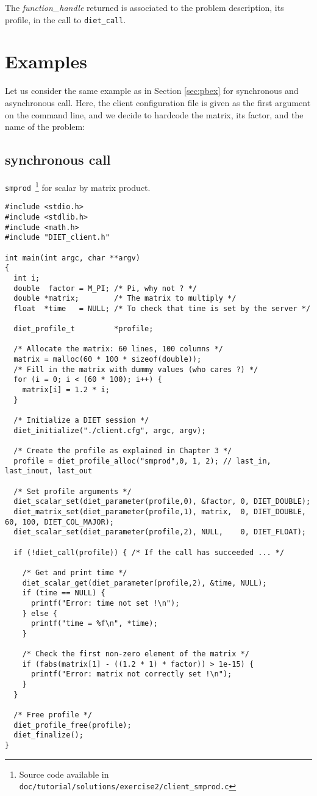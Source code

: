 The \emph{function\_handle} returned is associated to the problem description,
its profile, in the call to \texttt{diet\_call}.

\section{Examples}
\label{sec:cl_ex}

Let us consider the same example as in Section \ref{sec:pbex} for synchronous 
and asynchronous call.  Here, the client configuration file is given as the 
first argument on the command line, and we decide to hardcode the matrix,
its factor, and the name of the problem:

\subsection{synchronous call}
\texttt{smprod}~\footnote{Source code available in \texttt{doc/tutorial/solutions/exercise2/client\_smprod.c}} for scalar by matrix product.

{\footnotesize
\begin{verbatim}
#include <stdio.h>
#include <stdlib.h>
#include <math.h>
#include "DIET_client.h"

int main(int argc, char **argv)
{
  int i;
  double  factor = M_PI; /* Pi, why not ? */
  double *matrix;        /* The matrix to multiply */
  float  *time   = NULL; /* To check that time is set by the server */

  diet_profile_t         *profile;

  /* Allocate the matrix: 60 lines, 100 columns */
  matrix = malloc(60 * 100 * sizeof(double));
  /* Fill in the matrix with dummy values (who cares ?) */
  for (i = 0; i < (60 * 100); i++) {
    matrix[i] = 1.2 * i;
  }
  
  /* Initialize a DIET session */
  diet_initialize("./client.cfg", argc, argv);

  /* Create the profile as explained in Chapter 3 */
  profile = diet_profile_alloc("smprod",0, 1, 2); // last_in, last_inout, last_out
  
  /* Set profile arguments */
  diet_scalar_set(diet_parameter(profile,0), &factor, 0, DIET_DOUBLE);
  diet_matrix_set(diet_parameter(profile,1), matrix,  0, DIET_DOUBLE, 60, 100, DIET_COL_MAJOR);
  diet_scalar_set(diet_parameter(profile,2), NULL,    0, DIET_FLOAT);
  
  if (!diet_call(profile)) { /* If the call has succeeded ... */
     
    /* Get and print time */
    diet_scalar_get(diet_parameter(profile,2), &time, NULL);
    if (time == NULL) {
      printf("Error: time not set !\n");
    } else {
      printf("time = %f\n", *time);
    }

    /* Check the first non-zero element of the matrix */
    if (fabs(matrix[1] - ((1.2 * 1) * factor)) > 1e-15) {
      printf("Error: matrix not correctly set !\n");
    }
  }

  /* Free profile */
  diet_profile_free(profile);
  diet_finalize();
}
\end{verbatim}
}


